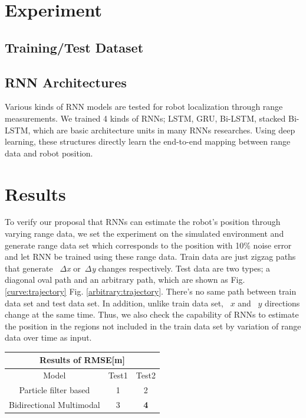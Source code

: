 \documentclass[letterpaper, 10 pt, conference]{ieeeconf}  %
\begin{document}
\section{Experiment}
\subsection{Training/Test Dataset}
 

\subsection{RNN Architectures}

Various kinds of RNN models are tested for robot localization through range measurements. We trained 4 kinds of RNNs; LSTM\cite{hochreiter1997long}, GRU\cite{cho2014learning}, Bi-LSTM\cite{schuster1997bidirectional}, stacked Bi-LSTM, which are basic architecture units in many RNNs researches. Using deep learning, these structures directly learn the end-to-end mapping between range data and robot position. 

\section{Results}

To verify our proposal that RNNs can estimate the robot's position through varying range data, we set the experiment on the simulated environment and generate range data set which corresponds to the position with 10\% noise error and let RNN be trained using these range data. Train data are just zigzag paths that generate ~\textit{$\Delta$x} or~\textit{$\Delta$y} changes respectively. Test data are two types; a diagonal oval path and an arbitrary path, which are shown as Fig. \ref{curve:trajectory} Fig. \ref{arbitrary:trajectory}. There's no same path between train data set and test data set. In addition, unlike train data set, ~\textit{$x$} and ~\textit{$y$} directions change at the same time. Thus, we also check the capability of RNNs to estimate the position in the regions not included in the train data set by variation of range data over time as input.


 
\begin{table}[h]
	\centering
	\begin{tabular}{cclcl}
		\hline
		\multicolumn{5}{c}{Results of RMSE{[}m{]}}                                                                  \\ \hline
		\multicolumn{1}{c|}{Model}                    & \multicolumn{2}{c|}{Test1} & \multicolumn{2}{c}{Test2}      \\ \hline
		\multicolumn{1}{c|}{Particle filter based}    & \multicolumn{2}{c|}{1}     & \multicolumn{2}{c}{2}          \\
		\multicolumn{1}{c|}{Bidirectional Multimodal} & \multicolumn{2}{c|}{3}     & \multicolumn{2}{c}{\textbf{4}}
	\end{tabular}
	\label{table_rmse}
\end{table}
\end{document}
